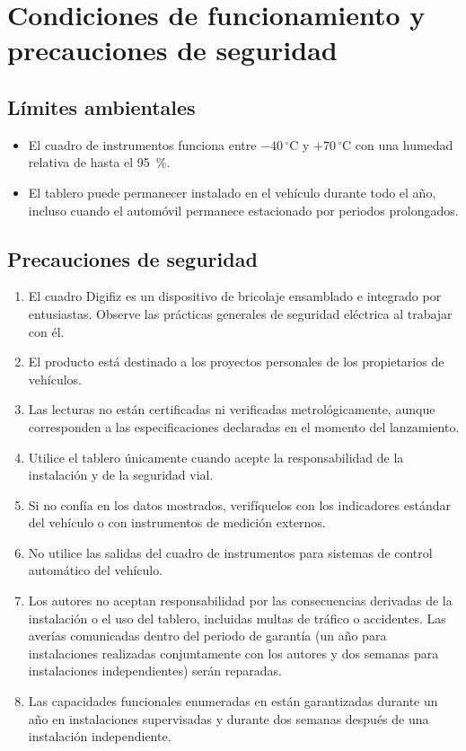 \chapter{Condiciones de funcionamiento y precauciones de seguridad}\label{ch:safety}

\section{Límites ambientales}
\begin{itemize}
    \item El cuadro de instrumentos funciona entre \(-40\,^{\circ}\mathrm{C}\) y \(+70\,^{\circ}\mathrm{C}\) con una humedad relativa de hasta el 95~\%.
    \item El tablero puede permanecer instalado en el vehículo durante todo el año, incluso cuando el automóvil permanece estacionado por periodos prolongados.
\end{itemize}

\section{Precauciones de seguridad}
\begin{enumerate}
    \item El cuadro Digifiz es un dispositivo de bricolaje ensamblado e integrado por entusiastas. Observe las prácticas generales de seguridad eléctrica al trabajar con él.
    \item El producto está destinado a los proyectos personales de los propietarios de vehículos.
    \item Las lecturas no están certificadas ni verificadas metrológicamente, aunque corresponden a las especificaciones declaradas en el momento del lanzamiento.
    \item Utilice el tablero únicamente cuando acepte la responsabilidad de la instalación y de la seguridad vial.
    \item Si no confía en los datos mostrados, verifíquelos con los indicadores estándar del vehículo o con instrumentos de medición externos.
    \item No utilice las salidas del cuadro de instrumentos para sistemas de control automático del vehículo.
    \item Los autores no aceptan responsabilidad por las consecuencias derivadas de la instalación o el uso del tablero, incluidas multas de tráfico o accidentes. Las averías comunicadas dentro del periodo de garantía (un año para instalaciones realizadas conjuntamente con los autores y dos semanas para instalaciones independientes) serán reparadas.
    \item Las capacidades funcionales enumeradas en  están garantizadas durante un año en instalaciones supervisadas y durante dos semanas después de una instalación independiente.
\end{enumerate}
